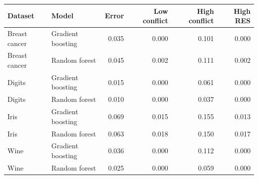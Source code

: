 \begin{tabular}{llrrrr}
\toprule
Dataset & Model & Error & Low conflict & High conflict & High RES \\
\midrule
Breast cancer & Gradient boosting & 0.035 & 0.000 & 0.101 & 0.000 \\
Breast cancer & Random forest & 0.045 & 0.002 & 0.111 & 0.002 \\
Digits & Gradient boosting & 0.015 & 0.000 & 0.061 & 0.000 \\
Digits & Random forest & 0.010 & 0.000 & 0.037 & 0.000 \\
Iris & Gradient boosting & 0.069 & 0.015 & 0.155 & 0.013 \\
Iris & Random forest & 0.063 & 0.018 & 0.150 & 0.017 \\
Wine & Gradient boosting & 0.036 & 0.000 & 0.112 & 0.000 \\
Wine & Random forest & 0.025 & 0.000 & 0.059 & 0.000 \\
\bottomrule
\end{tabular}
